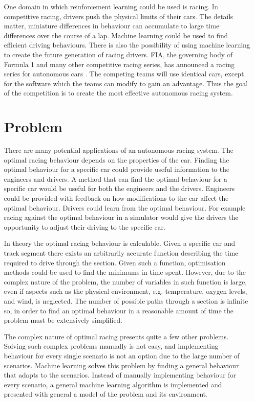 One domain in which reinforcement learning could be used is racing. In competitive racing, drivers push the physical limits of their cars. The details matter, miniature differences in behaviour can accumulate to large time differences over the course of a lap. Machine learning could be used to find efficient driving behaviours. There is also the possibility of using machine learning to create the future generation of racing drivers. FIA, the governing body of Formula 1 and many other competitive racing series, has announced a racing series for autonomous cars \cite{roborace}. The competing teams will use identical cars, except for the software which the teams can modify to gain an advantage. Thus the goal of the competition is to create the most effective autonomous racing system. 

\section{Problem}
There are many potential applications of an autonomous racing system. The optimal racing behaviour depends on the properties of the car. Finding the optimal behaviour for a specific car could provide useful information to the engineers and drivers. A method that can find the optimal behaviour for a specific car would be useful for both the engineers and the drivers. Engineers could be provided with feedback on how modifications to the car affect the optimal behaviour. Drivers could learn from the optimal behaviour. For example racing against the optimal behaviour in a simulator would give the drivers the opportunity to adjust their driving to the specific car.

In theory the optimal racing behaviour is calculable. Given a specific car and track segment there exists an arbitrarily accurate function describing the time required to drive through the section. Given such a function, optimisation methods could be used to find the minimums in time spent. However, due to the complex nature of the problem, the number of variables in such function is large, even if aspects such as the physical environment, e.g. temperature, oxygen levels, and wind, is neglected. The number of possible paths through a section is infinite so, in order to find an optimal behaviour in a reasonable amount of time the problem must be extensively simplified.

The complex nature of optimal racing presents quite a few other problems. Solving such complex problems manually is not easy, and implementing behaviour for every single scenario is not an option due to the large number of scenarios. Machine learning solves this problem by finding a general behaviour that adapts to the scenarios. Instead of manually implementing behaviour for every scenario, a general machine learning algorithm is implemented and presented with general a model of the problem and its environment.

